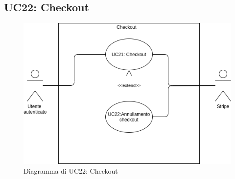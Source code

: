 \subsection{UC22: Checkout}
        \label{sec:UC22}
            \begin{figure}[!ht]
                \caption{Diagramma di UC22: Checkout}
                \vspace{10px}
                \includegraphics[scale=0.5]{../../../Images/AnalisiRequisiti/UC22}
                \centering
            \end{figure}

